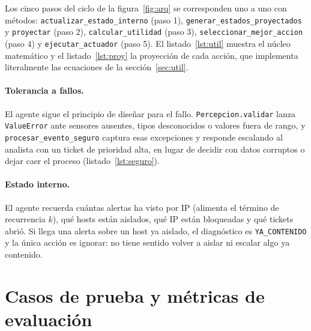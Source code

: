 \documentclass[11pt,a4paper]{article}
\begin{document}
Los cinco pasos del ciclo de la figura~\ref{fig:arq} se corresponden uno a uno con métodos: \texttt{actualizar\_estado\_interno} (paso 1), \texttt{generar\_estados\_proyectados} y \texttt{proyectar} (paso 2), \texttt{calcular\_utilidad} (paso 3), \texttt{seleccionar\_mejor\_accion} (paso 4) y \texttt{ejecutar\_actuador} (paso 5). El listado~\ref{lst:util} muestra el núcleo matemático y el listado~\ref{lst:proy} la proyección de cada acción, que implementa literalmente las ecuaciones de la sección~\ref{sec:util}.







\paragraph{Tolerancia a fallos.} El agente sigue el principio de diseñar para el fallo. \texttt{Percepcion.validar} lanza \texttt{ValueError} ante sensores ausentes, tipos desconocidos o valores fuera de rango, y \texttt{procesar\_evento\_seguro} captura esas excepciones y responde escalando al analista con un ticket de prioridad alta, en lugar de decidir con datos corruptos o dejar caer el proceso (listado~\ref{lst:seguro}).



\paragraph{Estado interno.} El agente recuerda cuántas alertas ha visto por IP (alimenta el término de recurrencia $k$), qué hosts están aislados, qué IP están bloqueadas y qué tickets abrió. Si llega una alerta sobre un host ya aislado, el diagnóstico es \texttt{YA\_CONTENIDO} y la única acción es ignorar: no tiene sentido volver a aislar ni escalar algo ya contenido.

\section{Casos de prueba y métricas de evaluación}\label{sec:pruebas}
\end{document}
